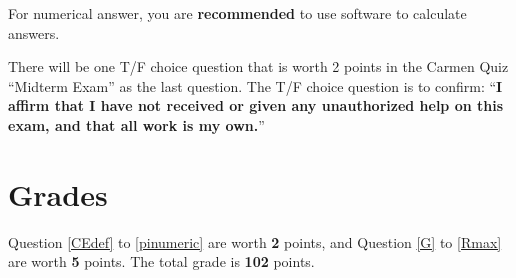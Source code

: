 \documentclass[14pt]{extarticle}
\begin{document}
For numerical answer, you are \textbf{recommended} to use software to calculate answers.

There will be one T/F choice question that is worth 2 points in the Carmen Quiz ``Midterm Exam'' as the last question. The T/F choice question is to confirm: ``\textbf{I affirm that I have not received or given any unauthorized help on this exam, and that all work is my own.}''

\section*{Grades}
\label{sec:Grades}

Question \ref{CEdef} to \ref{pinumeric} are worth \textbf{2} points, and Question \ref{G} to \ref{Rmax} are worth \textbf{5} points.
The total grade is \textbf{102} points.


\newpage
\end{document}
